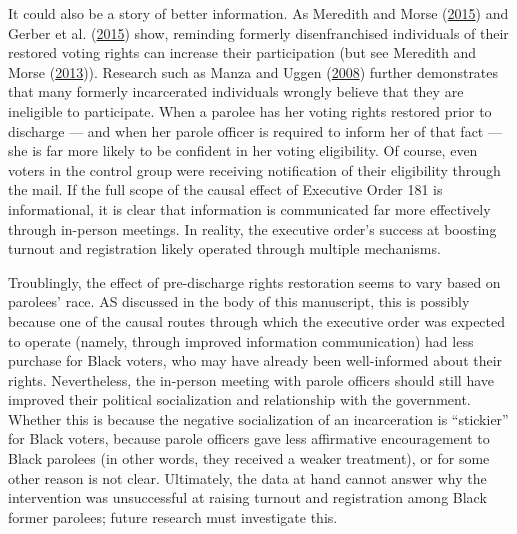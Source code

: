 \documentclass[
  12pt,
]{article}
\begin{document}
It could also be a story of better information. As Meredith and Morse (\protect\hyperlink{ref-Meredith2015}{2015}) and Gerber et al. (\protect\hyperlink{ref-Gerber2015}{2015}) show, reminding formerly disenfranchised individuals of their restored voting rights can increase their participation (but see Meredith and Morse (\protect\hyperlink{ref-Meredith2013}{2013})). Research such as Manza and Uggen (\protect\hyperlink{ref-locked_out}{2008}) further demonstrates that many formerly incarcerated individuals wrongly believe that they are ineligible to participate. When a parolee has her voting rights restored prior to discharge --- and when her parole officer is required to inform her of that fact --- she is far more likely to be confident in her voting eligibility. Of course, even voters in the control group were receiving notification of their eligibility through the mail. If the full scope of the causal effect of Executive Order 181 is informational, it is clear that information is communicated far more effectively through in-person meetings. In reality, the executive order's success at boosting turnout and registration likely operated through multiple mechanisms.

Troublingly, the effect of pre-discharge rights restoration seems to vary based on parolees' race. AS discussed in the body of this manuscript, this is possibly because one of the causal routes through which the executive order was expected to operate (namely, through improved information communication) had less purchase for Black voters, who may have already been well-informed about their rights. Nevertheless, the in-person meeting with parole officers should still have improved their political socialization and relationship with the government. Whether this is because the negative socialization of an incarceration is ``stickier'' for Black voters, because parole officers gave less affirmative encouragement to Black parolees (in other words, they received a weaker treatment), or for some other reason is not clear. Ultimately, the data at hand cannot answer why the intervention was unsuccessful at raising turnout and registration among Black former parolees; future research must investigate this.
\end{document}
